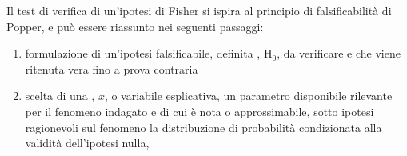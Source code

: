 \documentclass[letterpaper,10pt,italian]{jupyterBook}
\begin{document}
\sphinxAtStartPar
Il test di verifica di un’ipotesi di Fisher si ispira al principio di falsificabilità di Popper, e può essere riassunto nei seguenti passaggi:
\begin{enumerate}
%
\item {} 
\sphinxAtStartPar
formulazione di un’ipotesi falsificabile, definita , \(\text{H}_0\), da verificare e che viene ritenuta vera fino a prova contraria

\item {} 
\sphinxAtStartPar
scelta di una , \(x\), o variabile esplicativa, un parametro disponibile rilevante per il fenomeno indagato e di cui è nota \sphinxhyphen{} o approssimabile, sotto ipotesi ragionevoli sul fenomeno \sphinxhyphen{} la distribuzione di probabilità condizionata alla validità dell’ipotesi nulla,

\end{enumerate}
\end{document}
